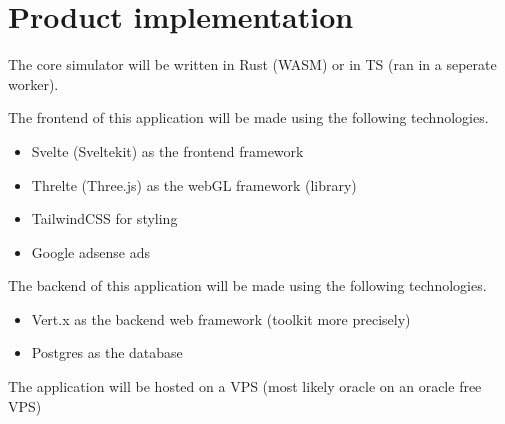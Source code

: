 \documentclass[12pt]{article}
\begin{document}
\section{Product implementation}
The core simulator will be written in Rust (WASM) or in TS (ran in a seperate worker).

The frontend of this application will be made using the following technologies.\\
\begin{itemize}
    \item Svelte (Sveltekit) as the frontend framework
    \item Threlte (Three.js) as the webGL framework (library)
    \item TailwindCSS for styling
    \item Google adsense ads
\end{itemize}
The backend of this application will be made using the following technologies.\\
\begin{itemize}
    \item Vert.x as the backend web framework (toolkit more precisely)
    \item Postgres as the database
\end{itemize}
The application will be hosted on a VPS (most likely oracle on an oracle free VPS)
\end{document}
